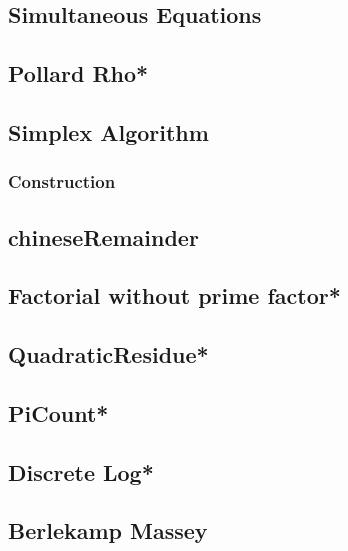 \subsection{Simultaneous Equations}

\subsection{Pollard Rho*} %

\subsection{Simplex Algorithm}

\subsubsection{Construction}

% 
\subsection{chineseRemainder}

\subsection{Factorial without prime factor*} %

\subsection{QuadraticResidue*} %

\subsection{PiCount*} %

\subsection{Discrete Log*} %

\subsection{Berlekamp Massey}


